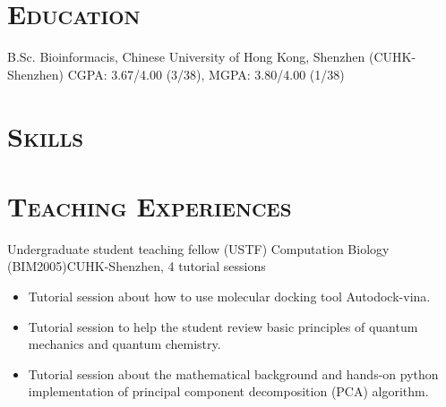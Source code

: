 \documentclass[11pt,a4paper]{moderncv}
\newcommand{\cvsection}[1]{\section{\textsc{#1}}}
\begin{document}
\maketitle

\cvsection{Education}
        {B.Sc.}
        {}
        {Bioinformacis, Chinese University of Hong Kong, Shenzhen (CUHK-Shenzhen)}
        {}
        {CGPA: 3.67/4.00 (3/38), MGPA: 3.80/4.00 (1/38)}

\cvsection{Skills}

\cvsection{Teaching Experiences}
        {Undergraduate student teaching fellow (USTF)}{}
        {Computation Biology (BIM2005)}{CUHK-Shenzhen, 4 tutorial sessions}
        {
            \begin{itemize}
                \item Tutorial session about how to use molecular docking tool Autodock-vina.
                \item Tutorial session to help the student review basic principles of quantum mechanics and quantum chemistry.
                \item Tutorial session about the mathematical background and hands-on python implementation of principal component decomposition (PCA) algorithm.
            \end{itemize}
        }
\end{document}
